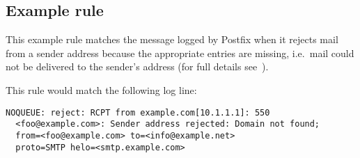 \documentclass[a4paper,12pt,draft]{article}
\begin{document}
\subsection{Example rule}

\label{example rule}

This example rule matches the message logged by Postfix when it rejects
mail from a sender address because the appropriate \DNS{} entries are
missing, i.e.\ mail could not be delivered to the sender's address (for
full details see~\cite{reject-unknown-sender-domain}).

This rule would match the following log line:

\begin{verbatim}
NOQUEUE: reject: RCPT from example.com[10.1.1.1]: 550
  <foo@example.com>: Sender address rejected: Domain not found;
  from=<foo@example.com> to=<info@example.net>
  proto=SMTP helo=<smtp.example.com>
\end{verbatim}
\end{document}
